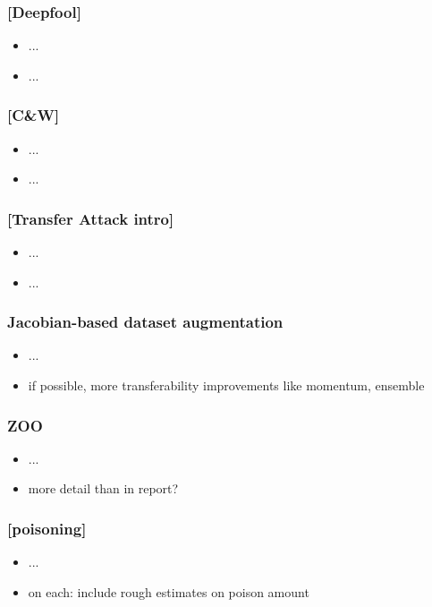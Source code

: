 \documentclass[t,english]{beamer}
\begin{document}
\begin{frame}
  \frametitle{[Deepfool]}
  
  \begin{itemize}
      \item ...
      \item ...
  \end{itemize}
\end{frame}

\begin{frame}
  \frametitle{[C&W]}
  
  \begin{itemize}
      \item ...
      \item ...
  \end{itemize}
\end{frame}

\begin{frame}
  \frametitle{[Transfer Attack intro]}
  
  \begin{itemize}
      \item ...
      \item ...
  \end{itemize}
\end{frame}

\begin{frame}
  \frametitle{Jacobian-based dataset augmentation}
  
  \begin{itemize}
      \item []...
      \item if possible, more transferability improvements like momentum, ensemble
  \end{itemize}
\end{frame}

\begin{frame}
  \frametitle{ZOO}
  
  \begin{itemize}
      \item []...
      \item more detail than in report?
  \end{itemize}
\end{frame}

\begin{frame}
  \frametitle{[poisoning]}
  
  \begin{itemize}
      \item []...
      \item on each: include rough estimates on poison amount
  \end{itemize}
\end{frame}
\end{document}
